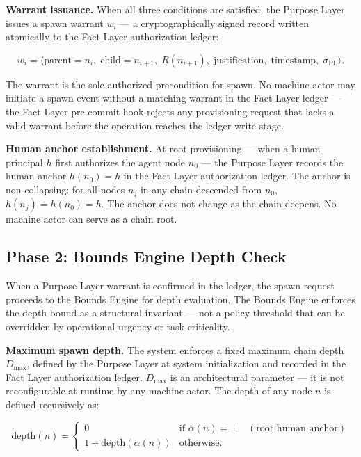 \medskip
\noindent\textbf{Warrant issuance.} When all three conditions are satisfied, the Purpose Layer issues a spawn warrant $w_i$ — a cryptographically signed record written atomically to the Fact Layer authorization ledger:

\begin{equation}
w_i = \bigl\langle
\text{parent}=n_i,\;
\text{child}=n_{i+1},\;
R(n_{i+1}),\;
\text{justification},\;
\text{timestamp},\;
\sigma_{\text{PL}}
\bigr\rangle .
\label{eq:spawn-warrant}
\end{equation}

The warrant is the sole authorized precondition for spawn. No machine actor may initiate a spawn event without a matching warrant in the Fact Layer ledger — the Fact Layer pre-commit hook rejects any provisioning request that lacks a valid warrant before the operation reaches the ledger write stage.

\medskip
\noindent\textbf{Human anchor establishment.} At root provisioning — when a human principal $h$ first authorizes the agent node $n_0$ — the Purpose Layer records the human anchor $h(n_0) = h$ in the Fact Layer authorization ledger. The anchor is non-collapsing: for all nodes $n_j$ in any chain descended from $n_0$, $h(n_j) = h(n_0) = h$. The anchor does not change as the chain deepens. No machine actor can serve as a chain root.

\subsection{Phase 2: Bounds Engine Depth Check}
\label{sec:rs-bounds-engine}

When a Purpose Layer warrant is confirmed in the ledger, the spawn request proceeds to the Bounds Engine for depth evaluation. The Bounds Engine enforces the depth bound as a structural invariant — not a policy threshold that can be overridden by operational urgency or task criticality.

\medskip
\noindent\textbf{Maximum spawn depth.} The system enforces a fixed maximum chain depth $D_{\max}$, defined by the Purpose Layer at system initialization and recorded in the Fact Layer authorization ledger. $D_{\max}$ is an architectural parameter — it is not reconfigurable at runtime by any machine actor. The depth of any node $n$ is defined recursively as:

\begin{equation}
\text{depth}(n) =
\begin{cases}
0 & \text{if } \alpha(n) = \bot \quad (\text{root human anchor}) \\[6pt]
1 + \text{depth}(\alpha(n)) & \text{otherwise}.
\end{cases}
\label{eq:chain-depth}
\end{equation}

